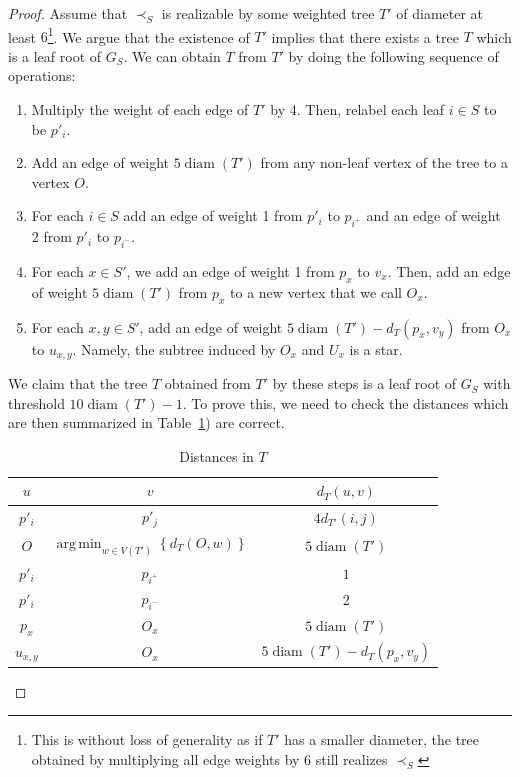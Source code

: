\documentclass[11pt, letter]{article}
\theoremstyle{remark}
\DeclareMathOperator{\diam}{diam}
\newcommand{\set}[1]{\left\{#1\right\}}
\DeclareMathOperator*{\argmin}{arg\,min}
\begin{document}
\begin{proof}
Assume that $\prec_S$ is realizable by some weighted tree $T'$ of diameter at least $6$\footnote{This is without loss of generality as if $T'$ has a smaller diameter, the tree obtained by multiplying all edge weights by 6 still realizes $\prec_S$}.  We argue that the existence of $T'$ implies that there exists a tree $T$ which is a leaf root of $G_S$. We can obtain $T$ from $T'$ by doing the following sequence of operations:

\begin{enumerate}
    \item Multiply the weight of each edge of $T'$ by 4. Then, relabel each leaf $i\in S$ to be $p'_i$. \label{tree:mult}
    \item Add an edge of weight $5\diam(T')$ from any non-leaf vertex of the tree to a vertex $O$.\label{tree:O}
    \item For each $i\in S$  add an edge of weight 1 from $p'_i$ to $p_{i^+}$ and an edge of weight 2 from $p'_i$ to $p_{i^-}$. \label{tree:duplicate}
    \item For each $x\in S'$, we add an edge of weight 1 from $p_x$ to $v_x$. Then, add an edge of weight $5\diam(T')$ from $p_x$ to a new vertex that we call $O_{x}$.\label{tree:S'}
    \item For each $x,y\in S'$, add an edge of weight $5\diam(T')-d_T(p_x,v_y)$ from $O_x$ to $u_{x,y}$. Namely, the subtree induced by $O_x$ and $U_{x}$ is a star.\label{tree:u}
\end{enumerate}

We claim that the tree $T$ obtained from $T'$ by these steps is a leaf root of $G_S$ with threshold $10\diam(T')-1$. To prove this, we need to check the distances which are then summarized in Table~\ref{tab:dist}) are correct. 

\begin{table}[ht!]
    \centering
    \begin{tabular}{c|c|c}
         $u$ & $v$ & $d_T(u,v)$\\
         \hline
         $p'_i$ & $p'_j$ & $4d_{T'}(i,j)$\\
         \hline
         $O$ & $\argmin_{w\in V(T')} \set{d_T(O,w)}$ & $5\diam(T')$\\
         \hline
         $p'_i$ & $p_{i^+}$ & $1$\\
         \hline
         $p'_i$ & $p_{i^-}$ & 2\\
         \hline
         $p_x$ & $O_x$ & $5\diam(T')$\\
         \hline
         $u_{x,y}$ & $O_x$ & $5\diam(T')-d_T(p_x,v_y)$
    \end{tabular}
    \caption{Distances in $T$}
    \label{tab:dist}
\end{table}


\end{proof}
\end{document}
